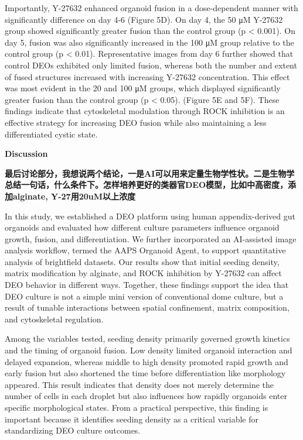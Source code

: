 \documentclass[
]{article}
\begin{document}
Importantly, Y-27632 enhanced organoid fusion in a dose-dependent manner with significantly difference on day 4-6 (Figure 5D). On day 4, the 50 μM Y-27632 group showed significantly greater fusion than the control group (p \textless{} 0.001). On day 5, fusion was also significantly increased in the 100 μM group relative to the control group (p \textless{} 0.01). Representative images from day 6 further showed that control DEOs exhibited only limited fusion, whereas both the number and extent of fused structures increased with increasing Y-27632 concentration. This effect was most evident in the 20 and 100 μM groups, which displayed significantly greater fusion than the control group (p \textless{} 0.05). (Figure 5E and 5F). These findings indicate that cytoskeletal modulation through ROCK inhibition is an effective strategy for increasing DEO fusion while also maintaining a less differentiated cystic state.

\textbf{Discussion}

\textbf{最后讨论部分，我想说两个结论，一是AI可以用来定量生物学性状。二是生物学总结一句话，什么条件下。怎样培养更好的类器官DEO模型，比如中高密度，添加alginate, Y-27用20uM以上浓度}

In this study, we established a DEO platform using human appendix-derived gut organoids and evaluated how different culture parameters influence organoid growth, fusion, and differentiation. We further incorporated an AI-assisted image analysis workflow, termed the AAPS Organoid Agent, to support quantitative analysis of brightfield datasets. Our results show that initial seeding density, matrix modification by alginate, and ROCK inhibition by Y-27632 can affect DEO behavior in different ways. Together, these findings support the idea that DEO culture is not a simple mini version of conventional dome culture, but a result of tunable interactions between spatial confinement, matrix composition, and cytoskeletal regulation.

Among the variables tested, seeding density primarily governed growth kinetics and the timing of organoid fusion. Low density limited organoid interaction and delayed expansion, whereas middle to high density promoted rapid growth and early fusion but also shortened the time before differentiation like morphology appeared. This result indicates that density does not merely determine the number of cells in each droplet but also influences how rapidly organoids enter specific morphological states. From a practical perspective, this finding is important because it identifies seeding density as a critical variable for standardizing DEO culture outcomes.
\end{document}
